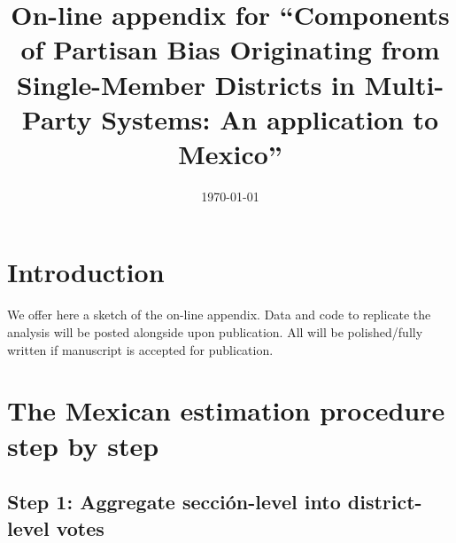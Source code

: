 \documentclass[letter,12pt]{article}
\begin{document}
\title{On-line appendix for ``Components of Partisan Bias Originating from Single-Member Districts in Multi-Party Systems: An application to Mexico''}
\date{\today}
\maketitle


\renewcommand{\thefigure}{A\arabic{figure}}
\setcounter{figure}{0}
\renewcommand{\thetable}{A\arabic{table}}
\setcounter{table}{0}
\renewcommand{\thesection}{A\arabic{section}}
\setcounter{section}{0}

\section{Introduction}

We offer here a sketch of the on-line appendix. Data and code to replicate the analysis will be posted alongside upon publication. All will be polished/fully written if manuscript is accepted for publication. 

\section{The Mexican estimation procedure step by step}

\subsection*{Step 1: Aggregate secci\'on-level into district-level votes}
\end{document}
